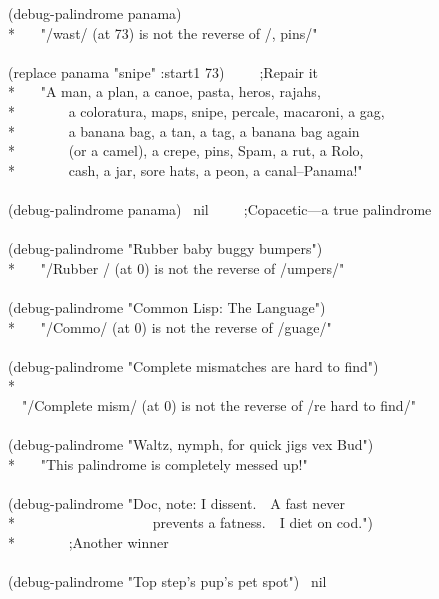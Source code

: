\begin{lisp}
(debug-palindrome panama) \\*
~~\EV\ "/wast/ (at 73) is not the reverse of /, pins/" \\
\\
(replace panama "snipe" :start1 73)~~~~~;\textrm{Repair it} \\*
~~\EV\ "A man, a plan, a canoe, pasta, heros, rajahs, \\*
~~~~~~~a coloratura, maps, snipe, percale, macaroni, a gag, \\*
~~~~~~~a banana bag, a tan, a tag, a banana bag again \\*
~~~~~~~(or a camel), a crepe, pins, Spam, a rut, a Rolo, \\*
~~~~~~~cash, a jar, sore hats, a peon, a canal--Panama!" \\
\\
(debug-palindrome panama) \EV\ nil~~~~~;\textrm{Copacetic---a true palindrome} \\
\\
(debug-palindrome "Rubber baby buggy bumpers") \\*
~~\EV\ "/Rubber / (at 0) is not the reverse of /umpers/" \\
\\
(debug-palindrome "Common Lisp: The Language") \\*
~~\EV\ "/Commo/ (at 0) is not the reverse of /guage/" \\
\\
(debug-palindrome "Complete mismatches are hard to find") \\*
~~\EV\ \\
~~"/Complete mism/ (at 0) is not the reverse of /re hard to find/" \\
\\
(debug-palindrome "Waltz, nymph, for quick jigs vex Bud") \\*
~~\EV\ "This palindrome is completely messed up!" \\
\\
(debug-palindrome "Doc, note: I dissent.~~A fast never \\*
~~~~~~~~~~~~~~~~~~~prevents a fatness.~~I diet on cod.") \\*
~~\EV\nil~~~~~;\textrm{Another winner} \\
\\
(debug-palindrome "Top step's pup's pet spot") \EV\ nil
\end{lisp}


